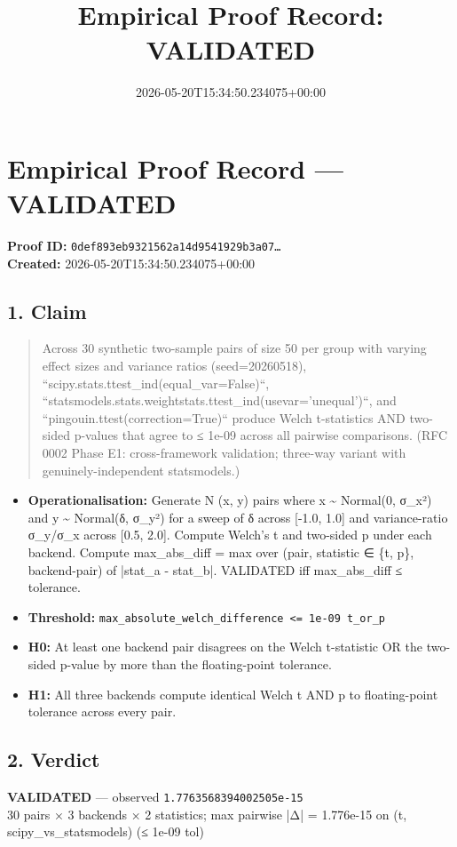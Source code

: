 \documentclass{article}
\title{Empirical Proof Record: VALIDATED}
\date{2026-05-20T15:34:50.234075+00:00}
\begin{document}
\maketitle
\section*{Empirical Proof Record --- \textcolor{validated}{\textbf{VALIDATED}}}
\textbf{Proof ID:} \texttt{0def893eb9321562a14d9541929b3a07\dots}\\
\textbf{Created:} 2026-05-20T15:34:50.234075+00:00
\subsection*{1. Claim}
\begin{quote}Across 30 synthetic two-sample pairs of size 50 per group with varying effect sizes and variance ratios (seed=20260518), ``scipy.stats.ttest\_ind(equal\_var=False)``, ``statsmodels.stats.weightstats.ttest\_ind(usevar='unequal')``, and ``pingouin.ttest(correction=True)`` produce Welch t-statistics AND two-sided p-values that agree to ≤ 1e-09 across all pairwise comparisons. (RFC 0002 Phase E1: cross-framework validation; three-way variant with genuinely-independent statsmodels.)\end{quote}
\begin{itemize}
\item \textbf{Operationalisation:} Generate N (x, y) pairs where x \textasciitilde{} Normal(0, σ\_x²) and y \textasciitilde{} Normal(δ, σ\_y²) for a sweep of δ across [-1.0, 1.0] and variance-ratio σ\_y/σ\_x across [0.5, 2.0]. Compute Welch's t and two-sided p under each backend. Compute max\_abs\_diff = max over (pair, statistic ∈ \{t, p\}, backend-pair) of |stat\_a - stat\_b|. VALIDATED iff max\_abs\_diff ≤ tolerance.
\item \textbf{Threshold:} \texttt{max\_absolute\_welch\_difference <= 1e-09 t\_or\_p}
\item \textbf{H0:} At least one backend pair disagrees on the Welch t-statistic OR the two-sided p-value by more than the floating-point tolerance.
\item \textbf{H1:} All three backends compute identical Welch t AND p to floating-point tolerance across every pair.
\end{itemize}
\subsection*{2. Verdict}
\textcolor{validated}{\textbf{VALIDATED}} --- observed \texttt{1.7763568394002505e-15}\\
30 pairs × 3 backends × 2 statistics; max pairwise |Δ| = 1.776e-15 on (t, scipy\_vs\_statsmodels) (≤ 1e-09 tol)
\end{document}
